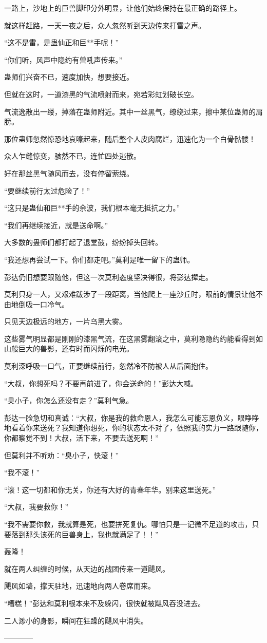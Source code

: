 \begin{this_body}
一路上，沙地上的巨兽脚印分外明显，让他们始终保持在最正确的路径上。

就这样赶路，一天一夜之后，众人忽然听到天边传来打雷之声。

“这不是雷，是蛊仙正和巨**手呢！”

“你们听，风声中隐约有兽吼声传来。”

蛊师们兴奋不已，速度加快，想要接近。

但就在这时，一道漆黑的气流喷射而来，宛若彩虹划破长空。

气流逸散出一缕，掉落在蛊师附近。其中一丝黑气，缭绕过来，擦中某位蛊师的肩膀。

那位蛊师忽然惊恐地哀嚎起来，随后整个人皮肉腐烂，迅速化为一个白骨骷髅！

众人乍缝惊变，骇然不已，连忙四处逃散。

好在那丝黑气随风而去，没有停留萦绕。

“要继续前行太过危险了！”

“这只是蛊仙和巨**手的余波，我们根本毫无抵抗之力。”

“我们再继续接近，就是送命啊。”

大多数的蛊师们都打起了退堂鼓，纷纷掉头回转。

“我还想再尝试一下。你们都走吧。”莫利是唯一留下的蛊师。

彭达仍旧想要跟随他，但这一次莫利态度坚决得很，将彭达撵走。

莫利只身一人，又艰难跋涉了一段距离，当他爬上一座沙丘时，眼前的情景让他不由地倒吸一口冷气。

只见天边极远的地方，一片乌黑大雾。

这些雾气明显都是刚刚的漆黑气流，在这黑雾翻滚之中，莫利隐隐约约能看得到如山般巨大的兽影，还有时而闪烁的电光。

莫利深呼吸一口气，正要继续前行，忽然冷不防被人从后面抱住。

“大叔，你想死吗？不要再前进了，你会送命的！”彭达大喊。

“臭小子，你怎么还没有走？”莫利气急。

彭达一脸急切和真诚：“大叔，你是我的救命恩人，我怎么可能忘恩负义，眼睁睁地看着你来送死？我知道你想死，你的状态太不对了，依照我的实力一路跟随你，你都察觉不到！大叔，活下来，不要去送死啊！”

但莫利并不听劝：“臭小子，快滚！”

“我不滚！”

“滚！这一切都和你无关，你还有大好的青春年华。别来这里送死。”

“大叔，我要救你！”

“我不需要你救，我就算是死，也要拼死复仇。哪怕只是一记微不足道的攻击，只要落到那头该死的巨兽身上，我也就满足了！！”

轰隆！

就在两人纠缠的时候，从天边的战团传来一道飓风。

飓风如墙，撑天驻地，迅速地向两人卷席而来。

“糟糕！”彭达和莫利根本来不及躲闪，很快就被飓风吞没进去。

二人渺小的身影，瞬间在狂躁的飓风中消失。

------------

\end{this_body}

